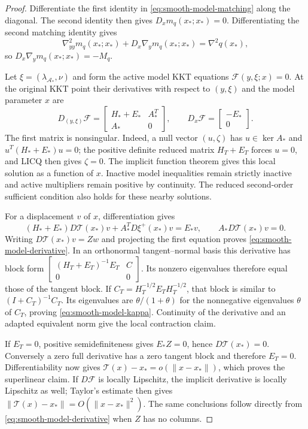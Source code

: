 \documentclass[pdflatex,sn-mathphys-num]{sn-jnl}
\theoremstyle{thmstyleone}
\theoremstyle{thmstylethree}
\begin{document}
\begin{proof}
Differentiate the first identity in \eqref{eq:smooth-model-matching}
along the diagonal. The second identity then gives
$D_xm_q(x_*;x_*)=0$. Differentiating the second matching identity gives
\[
 \nabla^2_{yy}m_q(x_*;x_*)+
 D_x\nabla_y m_q(x_*;x_*)=\nabla^2q(x_*),
\]
so $D_x\nabla_y m_q(x_*;x_*)=-M_q$.

Let $\xi=(\lambda_{\mathcal A_*},\nu)$ and form the active model KKT
equations $\mathcal F(y,\xi;x)=0$. At the original KKT point their
derivatives with respect to $(y,\xi)$ and the model parameter $x$ are
\[
 D_{(y,\xi)}\mathcal F=
 \begin{bmatrix}H_*+E_*&A_*^T\\A_*&0\end{bmatrix},
 \qquad
 D_x\mathcal F=\begin{bmatrix}-E_*\\0\end{bmatrix}.
\]
The first matrix is nonsingular. Indeed, a null vector $(u,\zeta)$ has
$u\in\ker A_*$ and $u^T(H_*+E_*)u=0$; the positive definite reduced
matrix $H_T+E_T$ forces $u=0$, and LICQ then gives $\zeta=0$.
The implicit function theorem gives this local solution as a function of $x$.
Inactive model inequalities remain strictly inactive and active
multipliers remain positive by continuity. The reduced second-order
sufficient condition also holds for these nearby solutions.

For a displacement $v$ of $x$, differentiation gives
\[
 (H_*+E_*)D\mathcal T(x_*)v+A_*^TD\xi^+(x_*)v=E_*v,
 \qquad A_*D\mathcal T(x_*)v=0.
\]
Writing $D\mathcal T(x_*)v=Zw$ and projecting the first equation proves
\eqref{eq:smooth-model-derivative}. In an orthonormal tangent--normal
basis this derivative has block form
$[\begin{smallmatrix}(H_T+E_T)^{-1}E_T&C\\0&0\end{smallmatrix}]$.
Its nonzero eigenvalues therefore equal those of the tangent block.
If $C_T=H_T^{-1/2}E_TH_T^{-1/2}$, that block is similar to
$(I+C_T)^{-1}C_T$. Its eigenvalues are $\theta/(1+\theta)$ for the
nonnegative eigenvalues $\theta$ of $C_T$, proving
\eqref{eq:smooth-model-kappa}. Continuity of the derivative and an
adapted equivalent norm give the local contraction claim.

If $E_T=0$, positive semidefiniteness gives $E_*Z=0$, hence
$D\mathcal T(x_*)=0$. Conversely a zero full derivative has a zero
tangent block and therefore $E_T=0$. Differentiability now gives
$\mathcal T(x)-x_*=o(\|x-x_*\|)$, which proves the superlinear claim.
If $D\mathcal F$ is locally Lipschitz, the implicit derivative is
locally Lipschitz as well; Taylor's estimate then gives
$\|\mathcal T(x)-x_*\|=O(\|x-x_*\|^2)$. The same conclusions follow
directly from \eqref{eq:smooth-model-derivative} when $Z$ has no columns.
\end{proof}
\end{document}
